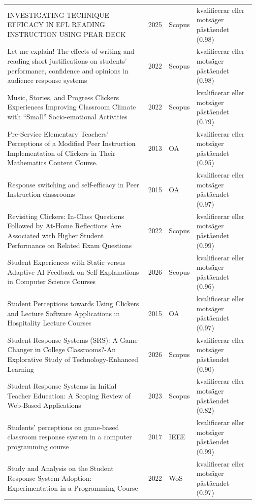 \begin{longtable}{@{}%
  >{\raggedright\arraybackslash}p{}c%
  >{\raggedright\arraybackslash}p{}%
  >{\raggedright\arraybackslash}p{}@{}}
INVESTIGATING TECHNIQUE EFFICACY IN EFL READING INSTRUCTION USING PEAR DECK & 2025 & Scopus & kvalificerar eller motsäger påståendet (0.98) \\
Let me explain! The effects of writing and reading short justifications on students' performance, confidence and opinions in audience response systems & 2022 & Scopus & kvalificerar eller motsäger påståendet (0.98) \\
Music, Stories, and Progress Clickers Experiences Improving Classroom Climate with ``Small'' Socio-emotional Activities & 2022 & Scopus & kvalificerar eller motsäger påståendet (0.79) \\
Pre-Service Elementary Teachers' Perceptions of a Modified Peer Instruction Implementation of Clickers in Their Mathematics Content Course. & 2013 & OA & kvalificerar eller motsäger påståendet (0.95) \\
Response switching and self-efficacy in Peer Instruction classrooms & 2015 & OA & kvalificerar eller motsäger påståendet (0.97) \\
Revisiting Clickers: In-Class Questions Followed by At-Home Reflections Are Associated with Higher Student Performance on Related Exam Questions & 2022 & Scopus & kvalificerar eller motsäger påståendet (0.99) \\
Student Experiences with Static versus Adaptive AI Feedback on Self-Explanations in Computer Science Courses & 2026 & Scopus & kvalificerar eller motsäger påståendet (0.96) \\
Student Perceptions towards Using Clickers and Lecture Software Applications in Hospitality Lecture Courses & 2015 & OA & kvalificerar eller motsäger påståendet (0.97) \\
Student Response Systems (SRS): A Game Changer in College Classrooms?-An Explorative Study of Technology-Enhanced Learning & 2026 & Scopus & kvalificerar eller motsäger påståendet (0.90) \\
Student Response Systems in Initial Teacher Education: A Scoping Review of Web-Based Applications & 2023 & Scopus & kvalificerar eller motsäger påståendet (0.82) \\
Students' perceptions on game-based classroom response system in a computer programming course & 2017 & IEEE & kvalificerar eller motsäger påståendet (0.99) \\
Study and Analysis on the Student Response System Adoption: Experimentation in a Programming Course & 2022 & WoS & kvalificerar eller motsäger påståendet (0.97) \\

\end{longtable}
